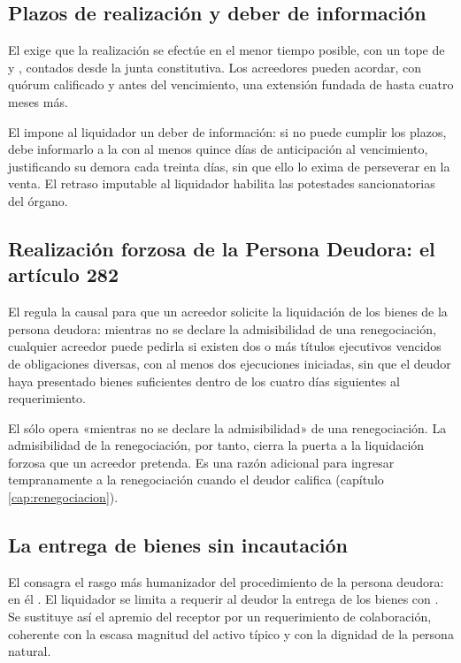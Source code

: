 \subsection{Plazos de realización y deber de información}

El  exige que la realización se efectúe en el menor tiempo posible, con un tope de
 y ,
contados desde la junta constitutiva. Los acreedores pueden acordar, con quórum calificado y
antes del vencimiento, una extensión fundada de hasta cuatro meses más.

El  impone al liquidador un deber de información: si no puede cumplir los plazos,
debe informarlo a la \superir{} con al menos quince días de anticipación al vencimiento,
justificando su demora cada treinta días, sin que ello lo exima de perseverar en la venta.
El retraso imputable al liquidador habilita las potestades sancionatorias del órgano.

\subsection{Realización forzosa de la Persona Deudora: el artículo 282}

El  regula la causal para que un acreedor solicite la liquidación de los bienes de
la persona deudora: mientras no se declare la admisibilidad de una renegociación, cualquier
acreedor puede pedirla si existen dos o más títulos ejecutivos vencidos de obligaciones
diversas, con al menos dos ejecuciones iniciadas, sin que el deudor haya presentado bienes
suficientes dentro de los cuatro días siguientes al requerimiento.

\begin{foco}
El  sólo opera «mientras no se declare la admisibilidad» de una renegociación. La
admisibilidad de la renegociación, por tanto, cierra la puerta a la liquidación forzosa que
un acreedor pretenda. Es una razón adicional para ingresar tempranamente a la renegociación
cuando el deudor califica (capítulo \ref{cap:renegociacion}).
\end{foco}

\subsection{La entrega de bienes sin incautación}

El  consagra el rasgo más humanizador del procedimiento de la persona deudora: en él
. El liquidador se limita a requerir al
deudor la entrega de los bienes con . Se sustituye
así el apremio del receptor por un requerimiento de colaboración, coherente con la escasa
magnitud del activo típico y con la dignidad de la persona natural.

